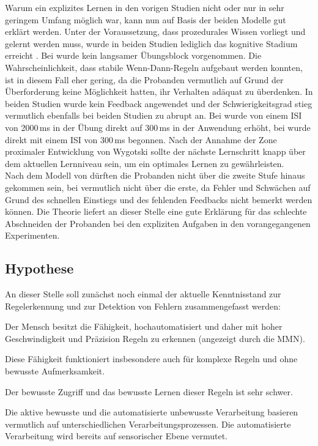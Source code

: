\documentclass[doc,a4paper,12pt]{apa6}
\begin{document}
Warum ein explizites Lernen in den vorigen Studien \parencites{bendixen2008rapid}{paavilainen2007preattentive} nicht oder nur in sehr geringem Umfang möglich war, kann nun auf Basis der beiden Modelle gut erklärt werden. Unter der Voraussetzung, dass prozedurales Wissen vorliegt und gelernt werden muss, wurde in beiden Studien lediglich das kognitive Stadium erreicht \parencite[nach][]{fitts1967human}. Bei \textcite{bendixen2008rapid} wurde kein langsamer Übungsblock vorgenommen. Die Wahrscheinlichkeit, dass stabile Wenn-Dann-Regeln aufgebaut werden konnten, ist in diesem Fall eher gering, da die Probanden vermutlich auf Grund der Überforderung keine Möglichkeit hatten, ihr Verhalten adäquat zu überdenken. In beiden Studien wurde kein Feedback angewendet und der Schwierigkeitsgrad stieg vermutlich ebenfalls bei beiden Studien zu abrupt an. Bei \textcite{paavilainen2007preattentive} wurde von einem ISI von 2000\,ms in der Übung direkt auf 300\,ms in der Anwendung erhöht, bei \textcite{bendixen2008rapid} wurde direkt mit einem ISI von 300\,ms begonnen. Nach der Annahme der Zone proximaler Entwicklung von Wygotski \parencite{kozulin2003vygotsky} sollte der nächste Lernschritt knapp über dem aktuellen Lernniveau sein, um ein optimales Lernen zu gewährleisten.\\
Nach dem Modell von \textcite{whitmore2009coaching} dürften die Probanden nicht über die zweite Stufe hinaus gekommen sein, bei \textcite{bendixen2008rapid} vermutlich nicht über die erste, da Fehler und Schwächen auf Grund des schnellen Einstiegs und des fehlenden Feedbacks nicht bemerkt werden können. Die Theorie liefert an dieser Stelle eine gute Erklärung für das schlechte Abschneiden der Probanden bei den expliziten Aufgaben in den vorangegangenen Experimenten.

\subsection{Hypothese}

An dieser Stelle soll zunächst noch einmal der aktuelle Kenntnisstand zur Regelerkennung und zur Detektion von Fehlern zusammengefasst werden:

\begin{compactitem}
\item Der Mensch besitzt die Fähigkeit, hochautomatisiert und daher mit hoher Geschwindigkeit und Präzision Regeln zu erkennen (angezeigt durch die MMN).
\item Diese Fähigkeit funktioniert insbesondere auch für komplexe Regeln und ohne bewusste Aufmerksamkeit.
\item Der bewusste Zugriff und das bewusste Lernen dieser Regeln ist sehr schwer.
\item Die aktive bewusste und die automatisierte unbewusste Verarbeitung basieren vermutlich auf unterschiedlichen Verarbeitungsprozessen. Die automatisierte Verarbeitung wird bereits auf sensorischer Ebene vermutet.
\end{compactitem}
\end{document}
